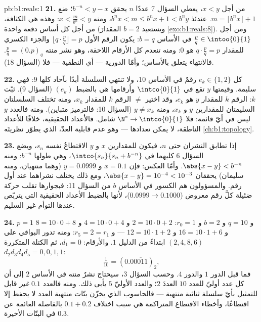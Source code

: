 \begin{solution}{pb:b1:reals:1}
\textbf{21.} من أجل $x < y$، يعطي السؤال 7 عددًا $n$ يحقق $b^{-n}
< y - x$؛ ضع $m = \lfloor b^n x \rfloor + 1$. عندئذ $b^n x < m
\leq b^n x + 1 < b^n y$، ومنه $x < \frac{m}{b^n} < y$: وهذه هي الكثافة،
من أجل كل أساس دفعة واحدة (ويستعيد $b = 2$ المقدارَ
\cref{exo:b1:reals:8}). ومن أجل $\frac pq \in \intoo{0}{1}$ في الأساس
$b = q$: يكون الرقم الأول $\lfloor q \cdot \frac pq \rfloor =
p$ والجزء الكسري للمقدار $q \cdot \frac pq = p$ هو $0$: ومنه تنعدم كل
الأرقام اللاحقة، وهو نشر منته $\frac pq =
(0.p)_q$. فالانتهاء يتعلق بالأساس؛ وأمّا الدورية ---
أي النطقية --- فلا (السؤال 18).

\textbf{22.} كل $e_k \in \{1, 2\}$ رقمٌ في الأساس $10$، ولا
تنتهي السلسلة أبدًا بآحاد كلها $9$: فهي سليمة. وقيمتها $y$ تقع في
$\intco{0}{1}$ وأرقامها هي بالضبط $(e_k)$ (السؤال 9). ثبّت
$k$: الرقم $k$ للمقدار $y$ هو $e_k$، وقد اختير $\neq$ الرقم $k$
للمقدار $x_k$، ومنه تختلف السلسلتان السليمتان للمقدارين $y$ و $x_k$، ومنه
$y \neq x_k$ (السؤال 10: فالترميز متباين). ومنه فالعدد $y$
ليس في أيّ قائمة: فلا  $\N^* \to \intco{0}{1}$ شامل. فالأعداد
الحقيقية، خلافًا للأعداد الناطقة، لا يمكن تعدادها ---
وهو عدم قابلية العدّ، الذي يطوّر نظريتَه \cref{ch:b1:topology}.

\textbf{23.} إذا تطابق النشران حتى $n$، فيكون للمقدارين $x$ و $y$
الاقتطاعُ نفسه $s_n$، ويضع السؤال 6 كليهما في
$\intco{s_n}{s_n + b^{-n}}$، وهي  طولها $b^{-n}$:
ومنه $\abs{x - y} < b^{-n}$. وأمّا العكس: فإن $x = 0.1$ و $y = 0.0999$
(وهما منتهيان، ومنه سليمان) يحققان $\abs{x - y} = 10^{-4} <
10^{-3}$، ومع ذلك يختلف نشراهما عند أول رقم.
والمسؤولون هم الكسور في الأساس $b$ من السؤال 11: فبجوارها
تقلب حركة ضئيلة كلَّ رقم معروض ($0.0999 \to
0.1000$)، لأنها بالضبط الأعداد الحقيقية التي
يتربّص عندها التوأم غير السليم.

\textbf{24.} $p = 1$ و $q = 10$ و $b = 2$ و $r_0 = 1$: $2 = 10 \cdot
0 + 2$ و $4 = 10 \cdot 0 + 4$ و $8 = 10 \cdot 0 + 8$ و $16 = 10
\cdot 1 + 6$ و $12 = 10 \cdot 1 + 2$ --- و $r_5 = 2 = r_1$: ومنه
تدور البواقي على $(2, 4, 8, 6)$ ابتداءً من الدليل $1$. والأرقام: $d_1 =
0$، ثم الكتلة المتكررة $d_2 d_3 d_4 d_5 = 0, 0, 1, 1$:
\[
\tfrac{1}{10} = (0.0\overline{0011})_2 ,
\]
فما قبل الدور $1$ والدور $4$. وحسب السؤال 3، سيحتاج نشرٌ منته في
الأساس $2$ إلى أن  كل عدد أوليّ للعدد $10$ العددَ $2$؛ والعدد الأوليّ
$5$ يأبى ذلك. ومنه فالعدد $0.1$ \emph{غير} قابل للتمثيل بأيّ سلسلة
ثنائية منتهية --- فالحاسوب الذي يخزّن بتّات منتهية العدد لا يحفظ
إلا اقتطاعًا، وأخطاء الاقتطاع المتراكمة هي سبب اختلاف
$0.1 + 0.2$ بالفاصلة العائمة عن $0.3$ في البتّات الأخيرة.


\end{solution}
